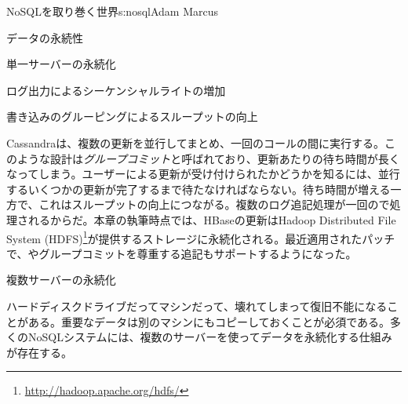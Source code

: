 \begin{aosachapter}{NoSQLを取り巻く世界}{s:nosql}{Adam Marcus}
\begin{aosasect1}{データの永続性}
\begin{aosasect2}{単一サーバーの永続化}
\begin{aosasect3}{ログ出力によるシーケンシャルライトの増加}
\end{aosasect3}

\begin{aosasect3}{書き込みのグルーピングによるスループットの向上}

Cassandraは、複数の更新を並行してまとめ、一回のコールの間に実行する。このような設計は\emph{グループコミット}と呼ばれており、更新あたりの待ち時間が長くなってしまう。ユーザーによる更新が受け付けられたかどうかを知るには、並行するいくつかの更新が完了するまで待たなければならない。待ち時間が増える一方で、これはスループットの向上につながる。複数のログ追記処理が一回ので処理されるからだ。本章の執筆時点では、HBaseの更新はHadoop Distributed File System (HDFS)\footnote{\url{http://hadoop.apache.org/hdfs/}}が提供するストレージに永続化される。最近適用されたパッチで、やグループコミットを尊重する追記もサポートするようになった。

\end{aosasect3}

\end{aosasect2}

\begin{aosasect2}{複数サーバーの永続化}

ハードディスクドライブだってマシンだって、壊れてしまって復旧不能になることがある。重要なデータは別のマシンにもコピーしておくことが必須である。多くのNoSQLシステムには、複数のサーバーを使ってデータを永続化する仕組みが存在する。


\end{aosasect2}
\end{aosasect1}
\end{aosachapter}
